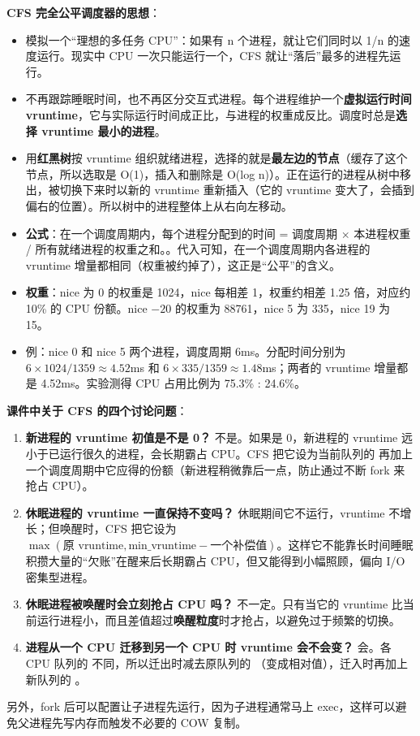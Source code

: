 \textbf{CFS 完全公平调度器的思想}：
\begin{itemize}
    \item 模拟一个“理想的多任务 CPU”：如果有 n 个进程，就让它们同时以 1/n 的速度运行。现实中 CPU 一次只能运行一个，CFS 就让“落后”最多的进程先运行。
    \item 不再跟踪睡眠时间，也不再区分交互式进程。每个进程维护一个\textbf{虚拟运行时间 vruntime}，它与实际运行时间成正比，与进程的权重成反比。调度时总是\textbf{选择 vruntime 最小的进程}。
    \item 用\textbf{红黑树}按 vruntime 组织就绪进程，选择的就是\textbf{最左边的节点}（缓存了这个节点，所以选取是 O(1)，插入和删除是 O(log n)）。正在运行的进程从树中移出，被切换下来时以新的 vruntime 重新插入（它的 vruntime 变大了，会插到偏右的位置）。所以树中的进程整体上从右向左移动。
    \item \textbf{公式}：在一个调度周期内，每个进程分配到的时间 = 调度周期 $\times$ 本进程权重 / 所有就绪进程的权重之和。\ez {}。代入可知，在一个调度周期内各进程的 vruntime 增量都相同（权重被约掉了），这正是“公平”的含义。
    \item \textbf{权重}：nice 为 0 的权重是 1024，nice 每相差 1，权重约相差 1.25 倍，对应约 10\% 的 CPU 份额。nice $-20$ 的权重为 88761，nice 5 为 335，nice 19 为 15。
    \item 例：nice 0 和 nice 5 两个进程，调度周期 6ms。分配时间分别为 $6 \times 1024/1359 \approx 4.52$ms 和 $6 \times 335/1359 \approx 1.48$ms；两者的 vruntime 增量都是 4.52ms。实验测得 CPU 占用比例为 75.3\% : 24.6\%。
\end{itemize}
\textbf{课件中关于 CFS 的四个讨论问题}：
\begin{enumerate}
    \item \textbf{新进程的 vruntime 初值是不是 0？} 不是。如果是 0，新进程的 vruntime 远小于已运行很久的进程，会长期霸占 CPU。CFS 把它设为当前队列的  再加上一个调度周期中它应得的份额（新进程稍微靠后一点，防止通过不断 fork 来抢占 CPU）。
    \item \textbf{休眠进程的 vruntime 一直保持不变吗？} 休眠期间它不运行，vruntime 不增长；但唤醒时，CFS 把它设为 $\max(\text{原 vruntime}, \text{min\_vruntime} - \text{一个补偿值})$。这样它不能靠长时间睡眠积攒大量的“欠账”在醒来后长期霸占 CPU，但又能得到小幅照顾，偏向 I/O 密集型进程。
    \item \textbf{休眠进程被唤醒时会立刻抢占 CPU 吗？} 不一定。只有当它的 vruntime 比当前运行进程小，而且差值超过\textbf{唤醒粒度}时才抢占，以避免过于频繁的切换。
    \item \textbf{进程从一个 CPU 迁移到另一个 CPU 时 vruntime 会不会变？} 会。各 CPU 队列的  不同，所以迁出时减去原队列的 （变成相对值），迁入时再加上新队列的 。
\end{enumerate}
另外，fork 后可以配置让子进程先运行，因为子进程通常马上 exec，这样可以避免父进程先写内存而触发不必要的 COW 复制。

